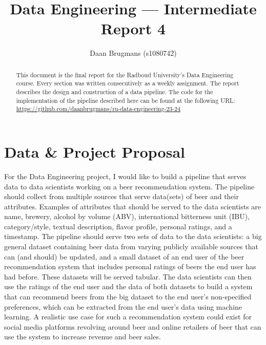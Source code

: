 \documentclass[sigconf, natbib=true]{acmart}
\begin{document}
\title{Data Engineering --- Intermediate Report 4}

\author{Daan Brugmans (s1080742)}

\begin{abstract}
    This document is the final report for the Radboud University's Data Engineering course.
    Every section was written consecutively as a weekly assignment.
    The report describes the design and construction of a data pipeline.
    The code for the implementation of the pipeline described here can be found at the following URL: \url{https://github.com/daanbrugmans/ru-data-engineering-23-24}
\end{abstract}

\maketitle
        


\section{Data \& Project Proposal}
For the Data Engineering project, I would like to build a pipeline that serves data to data scientists working on a beer recommendation system.
The pipeline should collect from multiple sources that serve data(sets) of beer and their attributes.
Examples of attributes that should be served to the data scientists are name, brewery, alcohol by volume (ABV), international bitterness unit (IBU), category/style, textual description, flavor profile, personal ratings, and a timestamp.
The pipeline should serve two sets of data to the data scientists: a big general dataset containing beer data from varying publicly available sources that can (and should) be updated, and a small dataset of an end user of the beer recommendation system that includes personal ratings of beers the end user has had before.
These datasets will be served tabular.
The data scientists can then use the ratings of the end user and the data of both datasets to build a system that can recommend beers from the big dataset to the end user's non-specified preferences, which can be extracted from the end user's data using machine learning.
A realistic use case for such a recommendation system could exist for social media platforms revolving around beer and online retailers of beer that can use the system to increase revenue and beer sales.
\end{document}
